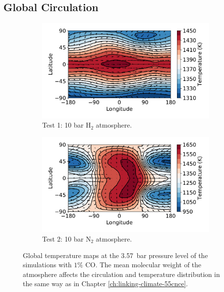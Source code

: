 \subsection{Global Circulation}

\begin{figure}
  \centering
  \begin{subfigure}[t]{0.48\textwidth}
    \includegraphics[width=\textwidth]{figures/soc-lava-planets/h2-soc-temp.pdf}
    \caption{Test 1: 10 bar H$_{2}$ atmosphere.}\label{fig:soc-temp-h2}
  \end{subfigure}
\quad
  \begin{subfigure}[t]{0.48\textwidth}
    \includegraphics[width=\textwidth]{figures/soc-lava-planets/n2-soc-temp.pdf}
    \caption{Test 2: 10 bar N$_{2}$ atmosphere.}\label{fig:soc-temp-n2}
  \end{subfigure}
  \caption{Global temperature maps at the \SI{3.57}{\bar} pressure level of the simulations with $1\%$ CO. The mean molecular weight of the atmosphere affects the circulation and temperature distribution in the same way as in Chapter \ref{ch:linking-climate-55cnce}.}
  \label{fig:soc-temp}
\end{figure}

